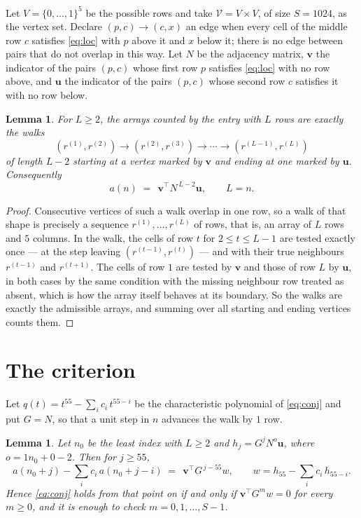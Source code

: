 \documentclass[11pt,a4paper]{article}
\theoremstyle{plain}
\newtheorem{lemma}[theorem]{Lemma}
\theoremstyle{definition}
\begin{document}
Let $V=\{0,\dots,1\}^{5}$ be the possible rows and take
$\mathcal V=V\times V$, of size $S=1024$, as the vertex set. Declare $(p,c)\to(c,x)$ an edge
when every cell of the middle row $c$ satisfies \eqref{eq:loc} with $p$ above it and $x$
below it; there is no edge between pairs that do not overlap in this way. Let $N$ be the
adjacency matrix, $\mathbf{v}$ the indicator of the pairs $(p,c)$ whose first row $p$
satisfies \eqref{eq:loc} with no row above, and $\mathbf{u}$ the indicator of
the pairs $(p,c)$ whose second row $c$ satisfies it with no row below.

\begin{lemma}\label{lem:walk}
For $L\ge2$, the arrays counted by the entry with $L$ rows are exactly the walks
\[
(r^{(1)},r^{(2)})\to(r^{(2)},r^{(3)})\to\cdots\to(r^{(L-1)},r^{(L)})
\]
of length $L-2$ starting at a vertex marked by $\mathbf{v}$ and ending at one marked by
$\mathbf{u}$. Consequently
\[
a(n)\;=\;\,\mathbf{v}^{\!\top}N^{\,L-2}\mathbf{u},\qquad L=n .
\]
\end{lemma}

\begin{proof}
Consecutive vertices of such a walk overlap in one row, so a walk of that shape is
precisely a sequence $r^{(1)},\dots,r^{(L)}$ of rows, that is, an array of $L$ rows
and $5$ columns. In the walk, the cells of row $t$ for $2\le t\le L-1$ are tested
exactly once --- at the step leaving $(r^{(t-1)},r^{(t)})$ --- and with their true
neighbours $r^{(t-1)}$ and $r^{(t+1)}$. The cells of row $1$ are tested by
$\mathbf{v}$ and those of row $L$ by $\mathbf{u}$, in both cases by the same condition
with the missing neighbour row treated as absent, which is how the array itself behaves at
its boundary. So the walks are exactly the admissible arrays, and summing over all starting
and ending vertices counts them.
\end{proof}

\section{The criterion}

Let $q(t)=t^{55}-\sum_i c_i\,t^{55-i}$ be the characteristic polynomial of
\eqref{eq:conj} and put $G=N$, so that a unit step in $n$ advances the walk by
$1$ row.

\begin{lemma}\label{lem:crit}
Let $n_0$ be the least index with $L\ge2$ and $h_j=G^{j}N^{o}\mathbf{u}$, where
$o=1n_0+0-2$. Then for $j\ge55$,
\[
a(n_0+j)-\sum_i c_i\,a(n_0+j-i)\;=\;\,\mathbf{v}^{\!\top}G^{\,j-55}w,
\qquad w=h_{55}-\sum_i c_i\,h_{55-i} .
\]
Hence \eqref{eq:conj} holds from that point on if and only if
$\mathbf{v}^{\!\top}G^{m}w=0$ for every $m\ge0$, and it is enough to check
$m=0,1,\dots,S-1$.
\end{lemma}
\end{document}
